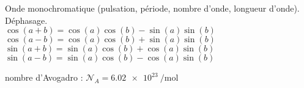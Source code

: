 
\debutFicheEntrainement                                                                      %




\begin{prerequis}
	Onde monochromatique (pulsation, période, nombre d'onde, longueur d'onde). Déphasage.\\
	$\cos (a+b)=\cos(a)\cos(b)-\sin(a)\sin(b)$\\ 
	$\cos (a-b)=\cos(a)\cos(b)+\sin(a)\sin(b)$\\ 
	$\sin (a+b)=\sin(a)\cos(b)+\cos(a)\sin(b)$\\ 
	$\sin (a-b)=\sin(a)\cos(b)-\cos(a)\sin(b)$\\ 
	
	\constantesUtiles
	\begin{listeConstantes}
		\item nombre d'Avogadro : $\mathcal{N}_A=\SI{6,02e23}{\per\mol}$
	\end{listeConstantes}
\end{prerequis}






